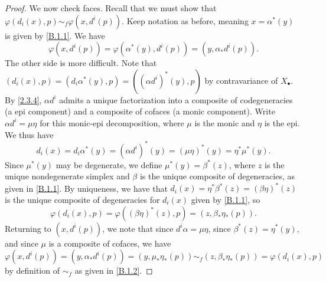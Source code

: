 \begin{proof}
	We now check faces. Recall that we must show that $\varphi(d_i(x),p)\sim_f\varphi(x,d^i(p))$. Keep notation as before, meaning $x=\alpha^*(y)$ is given by \cref{B.1.1}. We have
	\[
		\varphi(x,d^i(p))=\varphi(\alpha^*(y),d^i(p))=(y,\alpha_*d^i(p))
	.\]
	The other side is more difficult. Note that $(d_i(x),p)=(d_i\alpha^*(y),p)=((\alpha d^i)^*(y),p)$ by contravariance of $X_{\bullet} $. By \cref{2.3.4}, $\alpha d^i$ admits a unique factorization into a composite of codegeneracies (a epi component) and a composite of cofaces (a monic component). Write $\alpha d^i=\mu\eta$ for this monic-epi decomposition, where $\mu$ is the monic and $\eta$ is the epi. We thus have
	\[
		d_i(x)=d_i\alpha^*(y)=(\alpha d^i)^*(y)=(\mu\eta)^*(y)=\eta^*\mu^*(y)
	.\]
	Since $\mu^*(y)$ may be degenerate, we define $\mu^*(y)=\beta^*(z)$, where $z$ is the unique nondegenerate simplex and $\beta$ is the unique composite of degeneracies, as given in \cref{B.1.1}. By uniqueness, we have that $d_i(x)=\eta^*\beta^*(z)=(\beta\eta)^*(z)$ is the unique composite of degeneracies for $d_i(x)$ given by \cref{B.1.1}, so
	\[
		\varphi(d_i(x),p)=\varphi((\beta\eta)^*(z),p)=(z,\beta_*\eta_*(p))
	.\]
	Returning to $(x,d^i(p))$, we note that since $d^i\alpha=\mu\eta$, since $\beta^*(z)=\eta^*(y)$, and since $\mu$ is a composite of cofaces, we have
	\[
		\varphi(x,d^i(p))=(y,\alpha_*d^i(p))=(y,\mu_*\eta_*(p))\sim _f (z,\beta_*\eta_*(p))=\varphi(d_i(x),p)
	\]
	by definition of $\sim _f$ as given in \cref{B.1.2}.


\end{proof}
